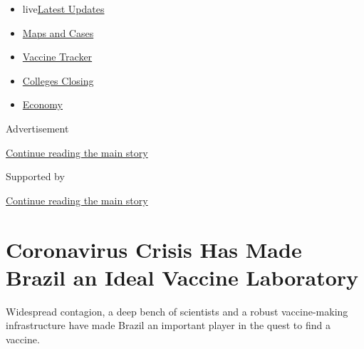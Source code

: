 \begin{itemize}
\tightlist
\item
  live\href{https://www.nytimes3xbfgragh.onion/2020/08/20/world/coronavirus-covid.html?name=styln-coronavirus-national\&region=TOP_BANNER\&variant=undefined\&block=storyline_menu_recirc\&action=click\&pgtype=Article\&impression_id=3e07c1c1-e386-11ea-bbe8-bf70f691015a}{Latest
  Updates}
\item
  \href{https://www.nytimes3xbfgragh.onion/interactive/2020/us/coronavirus-us-cases.html?name=styln-coronavirus-national\&region=TOP_BANNER\&variant=undefined\&block=storyline_menu_recirc\&action=click\&pgtype=Article\&impression_id=3e07c1c2-e386-11ea-bbe8-bf70f691015a}{Maps
  and Cases}
\item
  \href{https://www.nytimes3xbfgragh.onion/interactive/2020/science/coronavirus-vaccine-tracker.html?name=styln-coronavirus-national\&region=TOP_BANNER\&variant=undefined\&block=storyline_menu_recirc\&action=click\&pgtype=Article\&impression_id=3e07c1c3-e386-11ea-bbe8-bf70f691015a}{Vaccine
  Tracker}
\item
  \href{https://www.nytimes3xbfgragh.onion/2020/08/19/us/colleges-closing-covid.html?name=styln-coronavirus-national\&region=TOP_BANNER\&variant=undefined\&block=storyline_menu_recirc\&action=click\&pgtype=Article\&impression_id=3e07e8d0-e386-11ea-bbe8-bf70f691015a}{Colleges
  Closing}
\item
  \href{https://www.nytimes3xbfgragh.onion/live/2020/08/20/business/stock-market-today-coronavirus?name=styln-coronavirus-national\&region=TOP_BANNER\&variant=undefined\&block=storyline_menu_recirc\&action=click\&pgtype=Article\&impression_id=3e07e8d1-e386-11ea-bbe8-bf70f691015a}{Economy}
\end{itemize}

Advertisement

\protect\hyperlink{after-top}{Continue reading the main story}

Supported by

\protect\hyperlink{after-sponsor}{Continue reading the main story}

\hypertarget{coronavirus-crisis-has-made-brazil-an-ideal-vaccine-laboratory}{%
\section{Coronavirus Crisis Has Made Brazil an Ideal Vaccine
Laboratory}\label{coronavirus-crisis-has-made-brazil-an-ideal-vaccine-laboratory}}

Widespread contagion, a deep bench of scientists and a robust
vaccine-making infrastructure have made Brazil an important player in
the quest to find a vaccine.

